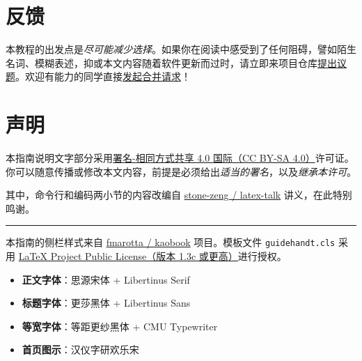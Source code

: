 \section{反馈}

\begin{widepar}
本教程的出发点是\emph{尽可能减少选择}。如果你在阅读中感受到了任何阻碍，譬如陌生名词、模糊表述，抑或本文内容随着软件更新而过时，请立即来项目仓库\href{https://git.nju.edu.cn/atXYblip/install-latex-instantly/-/issues/new}{提出议题}。欢迎有能力的同学直接\href{https://git.nju.edu.cn/atXYblip/install-latex-instantly/-/merge_requests/new}{发起合并请求}！

\end{widepar}

\section{声明}
\label{sec:copyright}

\begin{widepar}
\begin{center}
  \vskip -1cm
  \faCreativeCommons\;
  \faCreativeCommonsBy\;
  \faCreativeCommonsSa
\end{center}

\bigskip

本指南说明文字部分采用\href{https://creativecommons.org/licenses/by-sa/4.0/deed.zh}{署名-相同方式共享 4.0 国际（CC BY-SA 4.0）}许可证。你可以随意传播或修改本文内容，前提是必须给出\emph{适当的署名}，以及\emph{继承本许可}。

\medskip

其中，命令行和编码两小节的内容改编自 \href{https://github.com/stone-zeng/latex-talk}{stone-zeng / latex-talk} 讲义，在此特别鸣谢。

\smallskip

\begin{center}
  \rule{10cm}{1pt}
\end{center}

\bigskip

本指南的侧栏样式来自 \href{https://github.com/fmarotta/kaobook}{fmarotta / kaobook} 项目。模板文件 \texttt{guidehandt.cls} 采用 \href{http://www.latex-project.org/lppl.txt}{LaTeX Project Public License（版本 1.3c 或更高）}进行授权。

\begin{itemize}
  \item \textbf{正文字体}：思源宋体 +  Libertinus Serif
  \item \textbf{标题字体}：更莎黑体 +  Libertinus Sans
  \item \textbf{等宽字体}：等距更纱黑体 + CMU Typewriter
  \item \textbf{首页图示}：汉仪字研欢乐宋
\end{itemize}

\end{widepar}

